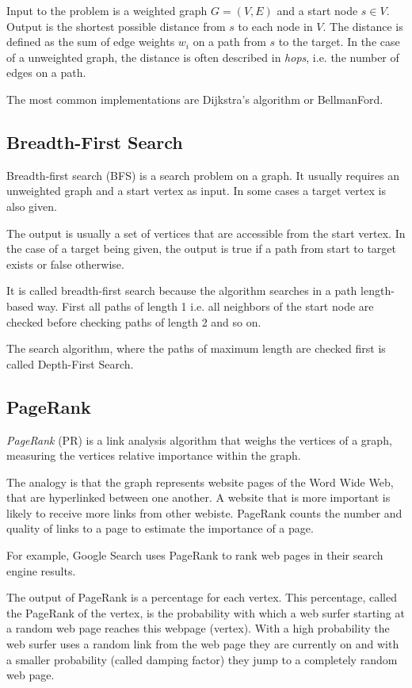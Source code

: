 Input to the problem is a weighted graph $G=(V,E)$ and a start node $s\in V$. Output is the shortest possible distance from $s$ to each node in $V$. 
The distance is defined as the sum of edge weights $w_i$ on a path from $s$ to the target.
In the case of a unweighted graph, the distance is often described in \emph{hops}, i.e. the number of edges on a path.

The most common implementations are Dijkstra's algorithm or BellmanFord.

\subsection{Breadth-First Search}
Breadth-first search (BFS) is a search problem on a graph. It usually requires an unweighted graph and a start vertex as input. In some cases a target vertex is also given.

The output is usually a set of vertices that are accessible from the start vertex. In the case of a target being given, the output is true if a path from start to target exists or false otherwise.

It is called breadth-first search because the algorithm searches in a path length-based way. First all paths of length 1 i.e. all neighbors of the start node are checked before checking paths of length 2 and so on.

The search algorithm, where the paths of maximum length are checked first is called Depth-First Search. 

\subsection{PageRank}
\emph{PageRank} (PR) is a link analysis algorithm that weighs the vertices of a graph, measuring the vertices relative importance within the graph.

The analogy is that the graph represents website pages of the Word Wide Web, that are hyperlinked between one another. A website that is more important is likely to receive more links from other webiste.
PageRank counts the number and quality of links to a page to estimate the importance of a page.

For example, Google Search uses PageRank to rank web pages in their search engine results.

The output of PageRank is a percentage for each vertex. This percentage, called the PageRank of the vertex, is the probability with which a web surfer starting at a random web page reaches this webpage (vertex). 
With a high probability the web surfer uses a random link from the web page they are currently on and with a smaller probability (called damping factor) they jump to a completely random web page.

